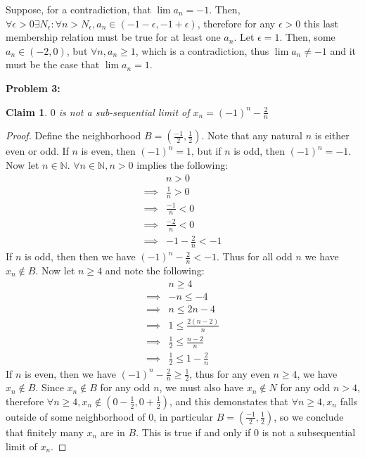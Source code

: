 \documentclass{article}
\newcommand{\nats}{\ensuremath{\mathbb{N}}}
\newcommand{\eps}{\ensuremath{\epsilon}}
\newtheorem{clm}{Claim}
\begin{document}
Suppose, for a contradiction, that $\lim a_n = -1$.
Then, $\forall \eps > 0 \exists N_\eps: \forall n > N_\eps, a_n \in (-1 - \eps, -1 + \eps)$,
therefore for any $\eps > 0$ this last membership relation must be true for at least one $a_n$.
Let $\eps = 1$. Then, some $a_n \in (-2, 0)$, but $\forall n, a_n \geq 1$,
which is a contradiction, thus $\lim a_n \neq -1$
and it must be the case that $\lim a_n = 1$.

\medskip
\textbf{Problem 3:}

\begin{clm}
	$0$ is not a sub-sequential limit of $x_n = (-1)^n - \frac{2}{n}$
\end{clm}

\begin{proof}
	Define the neighborhood $B = (\frac{-1}{2}, \frac{1}{2})$.
	Note that any natural $n$ is either even or odd.
	If $n$ is even, then $(-1)^n = 1$,
	but if $n$ is odd, then $(-1)^n = -1$.
	Now let $n \in \nats$.
	$\forall n \in \nats, n > 0$ implies the following:
	\begin{align}
		& n > 0 \\
		\implies & \frac{1}{n} > 0 \\
		\implies & \frac{-1}{n} < 0 \\
		\implies & \frac{-2}{n} < 0 \\
		\implies & -1 - \frac{2}{n} < -1
	\end{align}
	If $n$ is odd, then then we have
	$(-1)^n - \frac{2}{n} < -1$.
	Thus for all odd $n$ we have  $x_n \not\in B$.
	Now let $n \geq 4$ and note the following:
	\begin{align}
		& n \geq 4 \\
		\implies & -n \le -4 \\
		\implies & n \le 2n-4 \\
		\implies & 1 \le \frac{2(n-2)}{n} \\
		\implies & \frac{1}{2} \le \frac{n-2}{n} \\
		\implies & \frac{1}{2} \le 1 - \frac{2}{n}
	\end{align}
	If $n$ is even, then we have 
	$(-1)^n - \frac{2}{n} \geq \frac{1}{2}$,
	thus for any even $n \geq 4$, we have $x_n \not\in B$.
	Since $x_n \not\in B$ for any odd $n$,
	we must also have $x_n \not\in N$ for any odd $n > 4$,
	therefore $\forall n \geq 4, x_n \not\in (0- \frac{1}{2}, 0 + \frac{1}{2})$,
	and this demonstates that $\forall n\geq 4, x_n$ falls outside of some neighborhood of $0$,
	in particular $B = (\frac{-1}{2}, \frac{1}{2})$,
	so we conclude that finitely many $x_n$ are in $B$.
	This is true if and only if $0$
	is not a subsequential limit of $x_n$.
\end{proof}
\end{document}
